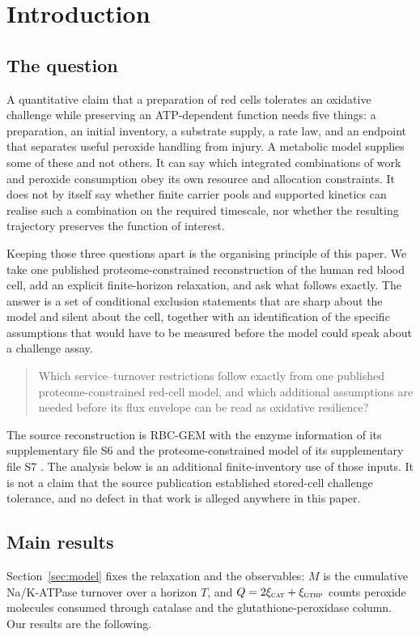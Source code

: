 \documentclass[11pt,a4paper]{article}
\theoremstyle{plain}
\theoremstyle{definition}
\theoremstyle{remark}
\newcommand{\rx}[1]{\textnormal{\textsc{#1}}}
\begin{document}
\section{Introduction}\label{sec:intro}

\subsection{The question}
A quantitative claim that a preparation of red cells tolerates an oxidative
challenge while preserving an ATP-dependent function needs five things: a
preparation, an initial inventory, a substrate supply, a rate law, and an
endpoint that separates useful peroxide handling from injury. A metabolic model
supplies some of these and not others. It can say which integrated combinations
of work and peroxide consumption obey its own resource and allocation
constraints. It does not by itself say whether finite carrier pools and
supported kinetics can realise such a combination on the required timescale,
nor whether the resulting trajectory preserves the function of interest.

Keeping those three questions apart is the organising principle of this paper.
We take one published proteome-constrained reconstruction of the human red
blood cell, add an explicit finite-horizon relaxation, and ask what follows
exactly. The answer is a set of conditional exclusion statements that are sharp
about the model and silent about the cell, together with an identification of
the specific assumptions that would have to be measured before the model could
speak about a challenge assay.

\begin{quote}
Which service--turnover restrictions follow exactly from one published
proteome-constrained red-cell model, and which additional assumptions are
needed before its flux envelope can be read as oxidative resilience?
\end{quote}

The source reconstruction is RBC-GEM with the enzyme information of its
supplementary file S6 and the proteome-constrained model of its supplementary
file S7 \citep{haiman2025}. The analysis below is an additional
finite-inventory use of those inputs. It is not a claim that the source
publication established stored-cell challenge tolerance, and no defect in that
work is alleged anywhere in this paper.

\subsection{Main results}
Section~\ref{sec:model} fixes the relaxation and the observables: $M$ is the
cumulative Na/K-ATPase turnover over a horizon $T$, and $Q=2\xi_{\rx{cat}}+
\xi_{\rx{gthp}}$ counts peroxide molecules consumed through catalase and the
glutathione-peroxidase column. Our results are the following.
\end{document}
